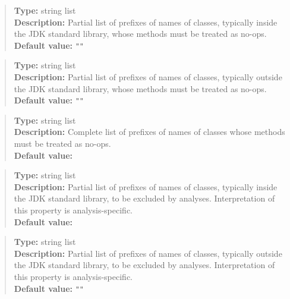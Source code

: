 
\begin{quote}
{\bf Type:} string list \\
{\bf Description:} Partial list of prefixes of names of classes, typically inside the JDK standard library, whose methods must be treated as no-ops. \\
{\bf Default value:} {\tt ""}
\end{quote}

\begin{quote}
{\bf Type:} string list \\
{\bf Description:} Partial list of prefixes of names of classes, typically outside the JDK standard library, whose methods must be treated as no-ops. \\
{\bf Default value:} {\tt ""}
\end{quote}

\begin{quote}
{\bf Type:} string list \\
{\bf Description:} Complete list of prefixes of names of classes whose methods must be treated as no-ops. \\
{\bf Default value:} 
\end{quote}

\begin{quote}
{\bf Type:} string list \\
{\bf Description:} Partial list of prefixes of names of classes, typically inside the JDK standard library, to be excluded by analyses.  Interpretation of this property is analysis-specific. \\
{\bf Default value:}  
\end{quote}

\begin{quote}
{\bf Type:} string list \\
{\bf Description:} Partial list of prefixes of names of classes, typically outside the JDK standard library, to be excluded by analyses.  Interpretation of this property is analysis-specific. \\
{\bf Default value:} {\tt ""}
\end{quote}

